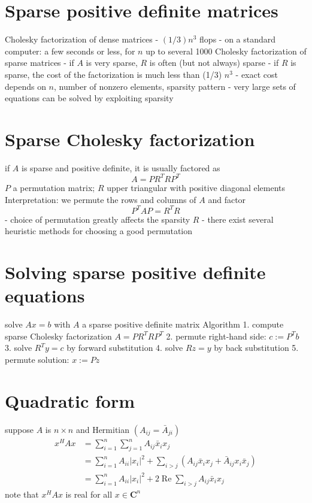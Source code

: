 \section{Sparse positive definite matrices}

Cholesky factorization of dense matrices
- $ (1 / 3) n^{3} $ flops
- on a standard computer: a few seconds or less, for $ n $ up to several 1000
Cholesky factorization of sparse matrices
- if $ A $ is very sparse, $ R $ is often (but not always) sparse
- if $ R $ is sparse, the cost of the factorization is much less than (1/3) $ n^{3} $
- exact cost depends on $ n $, number of nonzero elements, sparsity pattern
- very large sets of equations can be solved by exploiting sparsity

\section{Sparse Cholesky factorization}

if $ A $ is sparse and positive definite, it is usually factored as
$$
A=P R^{T} R P^{T}
$$
$ P $ a permutation matrix; $ R $ upper triangular with positive diagonal elements
Interpretation: we permute the rows and columns of $ A $ and factor
$$
P^{T} A P=R^{T} R
$$
- choice of permutation greatly affects the sparsity $ R $
- there exist several heuristic methods for choosing a good permutation

\section{Solving sparse positive definite equations}

solve $ A x=b $ with $ A $ a sparse positive definite matrix
Algorithm
1. compute sparse Cholesky factorization $ A=P R^{T} R P^{T} $
2. permute right-hand side: $ c:=P^{T} b $
3. solve $ R^{T} y=c $ by forward substitution
4. solve $ R z=y $ by back substitution
5. permute solution: $ x:=P z $

\section{Quadratic form}



suppose $A$ is $n \times n$ and Hermitian $\left(A_{i j}=\bar{A}_{j i}\right)$
$$
\begin{aligned}
x^{H} A x &=\sum_{i=1}^{n} \sum_{j=1}^{n} A_{i j} \bar{x}_{i} x_{j} \\
&=\sum_{i=1}^{n} A_{i i}\left|x_{i}\right|^{2}+\sum_{i>j}\left(A_{i j} \bar{x}_{i} x_{j}+\bar{A}_{i j} x_{i} \bar{x}_{j}\right) \\
&=\sum_{i=1}^{n} A_{i i}\left|x_{i}\right|^{2}+2 \operatorname{Re} \sum_{i>j} A_{i j} \bar{x}_{i} x_{j}
\end{aligned}
$$
note that $x^{H} A x$ is real for all $x \in \mathbf{C}^{n}$



